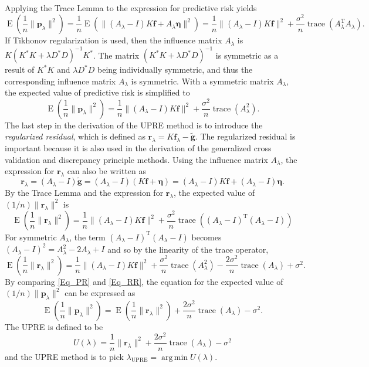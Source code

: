 \documentclass[12pt]{article}
\newcommand{\gnoise}{\widetilde{\mathbf{g}}}
\newcommand{\kmat}{K}	%
\newcommand{\fdis}{\mathbf{f}}
\newcommand{\trans}{\mathrm{T}}	%
\newcommand{\ctrans}{*}	%
\newcommand{\trace}{\operatorname{trace}}	%
\newcommand{\regparam}{\lambda}
\newcommand{\freg}{\fdis_{\regparam}}	%
\newcommand{\argmin}{\operatorname{arg\,min}} %
\newcommand{\noiseSD}{\sigma}	%
\newcommand{\noise}{\bm{\eta}}	%
\newcommand{\E}{\operatorname{E}}	%
\newcommand{\PE}{\mathbf{p}_{\regparam}}	%
\newcommand{\regres}{\mathbf{r}_{\regparam}}	%
\newcommand{\A}{A_{\regparam}}	%
\newcommand{\U}{U}	%
\begin{document}
\noindent Applying the Trace Lemma to the expression for predictive risk yields
\[\E\left(\frac{1}{n}\|\PE\|^2\right) = \frac{1}{n}\E\left(\|(\A-I)\kmat\fdis + \A\noise\|^2\right) = \frac{1}{n}\|(\A-I)\kmat\fdis\|^2 + \frac{\noiseSD^2}{n}\trace({\A^\trans}\A).\]
If Tikhonov regularization is used, then the influence matrix $\A$ is $\kmat(\kmat^\ctrans\kmat + \regparam{D^\ctrans}D)^{-1}\kmat^\ctrans$. The matrix $(\kmat^\ctrans\kmat + \regparam{D^\ctrans}D)^{-1}$ is symmetric as a result of $\kmat^\ctrans\kmat$ and $\regparam{D^\ctrans}D$ being individually symmetric, and thus the corresponding influence matrix $\A$ is symmetric.  With a symmetric matrix $\A$, the expected value of predictive risk is simplified to
\begin{equation}
\label{Eq_PR}
\E\left(\frac{1}{n}\|\PE\|^2\right) = \frac{1}{n}\|(\A-I)\kmat\fdis\|^2 + \frac{\noiseSD^2}{n}\trace(\A^2).
\end{equation}
\indent The last step in the derivation of the UPRE method is to introduce the \textit{regularized residual}, which is defined as $\regres = \kmat\freg - \gnoise$. The regularized residual is important because it is also used in the derivation of the generalized cross validation and discrepancy principle methods. Using the influence matrix $\A$, the expression for $\regres$ can also be written as
\[\regres = (\A-I)\gnoise = (\A-I)(\kmat\fdis + \noise) = (\A-I)\kmat\fdis + (\A-I)\noise.\]
By the Trace Lemma and the expression for $\regres$, the expected value of $(1/n)\|\regres\|^2$ is
\[\E\left(\frac{1}{n}\|\regres\|^2\right) = \frac{1}{n}\|(\A-I)\kmat\fdis\|^2 + \frac{\noiseSD^2}{n}\trace({(\A-I)^\trans}(\A-I))\]
For symmetric $\A$, the term $(\A-I)^\trans(\A-I)$ becomes $(\A-I)^2 = \A^2 - 2\A + I$ and so by the linearity of the trace operator,
\begin{equation}
\label{Eq_RR}
\E\left(\frac{1}{n}\|\regres\|^2\right) = \frac{1}{n}\|(\A-I)\kmat\fdis\|^2 + \frac{\noiseSD^2}{n}\trace(\A^2) - \frac{2\noiseSD^2}{n}\trace(\A) + \noiseSD^2.
\end{equation}
By comparing \eqref{Eq_PR} and \eqref{Eq_RR}, the equation for the expected value of $(1/n)\|\PE\|^2$ can be expressed as
\[\E\left(\frac{1}{n}\|\PE\|^2\right) = \E\left(\frac{1}{n}\|\regres\|^2\right) + \frac{2\noiseSD^2}{n}\trace(\A) - \noiseSD^2.\]
The UPRE is defined to be
\begin{equation}
\label{Eq_UPRE}
\U(\regparam) = \frac{1}{n}\|\regres\|^2 + \frac{2\noiseSD^2}{n}\trace(\A) - \noiseSD^2
\end{equation}
and the UPRE method is to pick $\regparam_{\text{UPRE}} = \argmin \U(\regparam)$. \par 
\end{document}
